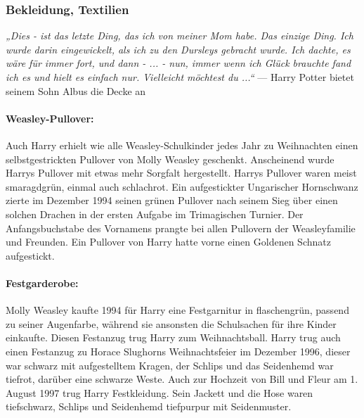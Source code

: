 \documentclass[a4paper, 10pt]{article}
\begin{document}
\subsubsection*{\large Bekleidung, Textilien}
\textit{„Dies - ist das letzte Ding, das ich von meiner Mom habe. Das einzige Ding. Ich wurde darin eingewickelt, als ich zu den Dursleys gebracht wurde. Ich dachte, es wäre für immer fort, und dann - ... - nun, immer wenn ich Glück brauchte fand ich es und hielt es einfach nur. Vielleicht möchtest du ...“}
\vspace{10pt}
\newline
{}  
— Harry Potter bietet seinem Sohn Albus die Decke an

\paragraph{Weasley-Pullover:}
Auch Harry erhielt wie alle Weasley-Schulkinder jedes Jahr zu Weihnachten einen selbstgestrickten Pullover von Molly Weasley geschenkt. Anscheinend wurde Harrys Pullover mit etwas mehr Sorgfalt hergestellt. Harrys Pullover waren meist smaragdgrün, einmal auch schlachrot. Ein aufgestickter Ungarischer Hornschwanz zierte im Dezember 1994 seinen grünen Pullover nach seinem Sieg über einen solchen Drachen in der ersten Aufgabe im Trimagischen Turnier. Der Anfangsbuchstabe des Vornamens prangte bei allen Pullovern der Weasleyfamilie und Freunden. Ein Pullover von Harry hatte vorne einen Goldenen Schnatz aufgestickt.
\paragraph{Festgarderobe:}
Molly Weasley kaufte 1994 für Harry eine Festgarnitur in flaschengrün, passend zu seiner Augenfarbe, während sie ansonsten die Schulsachen für ihre Kinder einkaufte. Diesen Festanzug trug Harry zum Weihnachtsball. Harry trug auch einen Festanzug zu Horace Slughorns Weihnachtsfeier im Dezember 1996, dieser war schwarz mit aufgestelltem Kragen, der Schlips und das Seidenhemd war tiefrot, darüber eine schwarze Weste. Auch zur Hochzeit von Bill und Fleur am 1. August 1997 trug Harry Festkleidung. Sein Jackett und die Hose waren tiefschwarz, Schlips und Seidenhemd tiefpurpur mit Seidenmuster.
\end{document}
